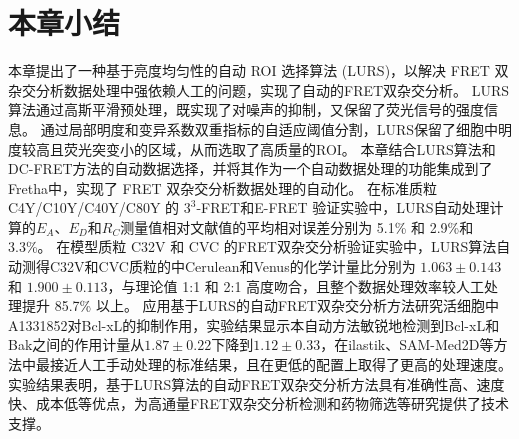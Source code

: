 \section{本章小结}
本章提出了一种基于亮度均匀性的自动 ROI 选择算法 (LURS)，以解决 FRET 双杂交分析数据处理中强依赖人工的问题，实现了自动的FRET双杂交分析。
LURS算法通过高斯平滑预处理，既实现了对噪声的抑制，又保留了荧光信号的强度信息。
通过局部明度和变异系数双重指标的自适应阈值分割，LURS保留了细胞中明度较高且荧光突变小的区域，从而选取了高质量的ROI。
本章结合LURS算法和DC-FRET方法的自动数据选择，并将其作为一个自动数据处理的功能集成到了Fretha中，实现了 FRET 双杂交分析数据处理的自动化。
在标准质粒 C4Y/C10Y/C40Y/C80Y 的 $3^3$-FRET和E-FRET 验证实验中，LURS自动处理计算的$E_A$、$E_D$和$R_C$测量值相对文献值的平均相对误差分别为 5.1\% 和 2.9\%和3.3\%。
在模型质粒 C32V 和 CVC 的FRET双杂交分析验证实验中，LURS算法自动测得C32V和CVC质粒的中Cerulean和Venus的化学计量比分别为 $1.063 \pm 0.143$ 和 $1.900 \pm 0.113$，与理论值 1:1 和 2:1 高度吻合，且整个数据处理效率较人工处理提升 85.7\% 以上。
应用基于LURS的自动FRET双杂交分析方法研究活细胞中A1331852对Bcl-xL的抑制作用，实验结果显示本自动方法敏锐地检测到Bcl-xL和Bak之间的作用计量从$1.87 \pm 0.22$下降到$1.12 \pm 0.33$，在ilastik、SAM-Med2D等方法中最接近人工手动处理的标准结果，且在更低的配置上取得了更高的处理速度。
实验结果表明，基于LURS算法的自动FRET双杂交分析方法具有准确性高、速度快、成本低等优点，为高通量FRET双杂交分析检测和药物筛选等研究提供了技术支撑。